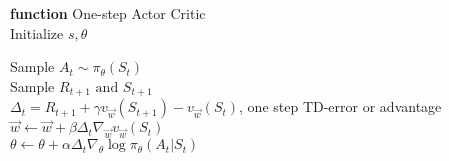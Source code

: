 \documentclass{standalone}
\begin{document}
\pagestyle{empty}
\begin{algorithm}[H]
  \textbf{function} One-step Actor Critic \\
  	Initialize $s, \theta$ \\

  	 {
  	Sample $A_t \sim \pi_\theta(S_t)$ \\
  	Sample $R_{t+1} \text{ and } S_{t+1}$ \\
  	$\Delta_t = R_{t+1} + \gamma v_{\vec{w}}(S_{t+1}) -v_{\vec{w}}(S_{t})$, one step TD-error or advantage\\
  	$\vec{w} \leftarrow \vec{w} + \beta \Delta_t \nabla_{\vec{w}} v_{\vec{w}}(S_t)$\\
	$\theta \leftarrow \theta + \alpha \Delta_t \nabla_{\theta} \log \pi_{\theta}(A_t|S_t)$
  
}

\end{algorithm}
\end{document}

